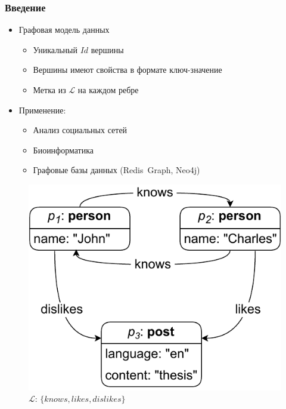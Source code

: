 \documentclass{beamer}
\begin{document}
\begin{frame}[fragile]
  \frametitle{Введение}
  \noindent\begin{minipage}{0.55\textwidth}
    \begin{itemize}
      \item Графовая модель данных
            \begin{itemize}
              \item Уникальный $Id$ вершины
              \item Вершины имеют свойства в формате ключ-значение
              \item Метка из $\mathcal{L}$ на каждом ребре
            \end{itemize}
      \item Применение:
            \begin{itemize}
              \item Анализ социальных сетей
              \item Биоинформатика
              \item Графовые базы данных (Redis~Graph, Neo4j)
            \end{itemize}
    \end{itemize}
  \end{minipage}
  \noindent\begin{minipage}{0.44\textwidth}
    \begin{figure}[h!]
      \includegraphics[width=1\linewidth]{pictures/graphmodel_intro.pdf}
      \caption*{$\mathcal{L}$: $\{knows, likes, dislikes\}$}
    \end{figure}
  \end{minipage}
\end{frame}
\end{document}
